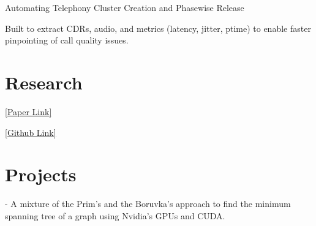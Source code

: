 \documentclass[]{deedy-resume-openfont}
\begin{document}
\begin{minipage}[t]{0.66\textwidth}
\begin{tightemize}
\item Automating Telephony Cluster Creation and Phasewise Release
\end{tightemize}
\sectionsep

\begin{tightemize}
\item Built  to extract CDRs, audio, and metrics (latency, jitter, ptime) to enable faster pinpointing of call quality issues. 
\end{tightemize}
\sectionsep


\section{Research}
     \href{http://www.sciencedirect.com/science/article/pii/S2212017313005537}{[Paper Link]}
\sectionsep

     \href{https://github.com/nabarunchatterjee/EvoComp}{[Github Link]}
\sectionsep
\sectionsep

\section{Projects}
     - A mixture of the Prim's and the Boruvka's approach to find the minimum spanning tree of a graph using Nvidia's GPUs and CUDA.
\sectionsep
\sectionsep


\end{minipage}
\end{document}
